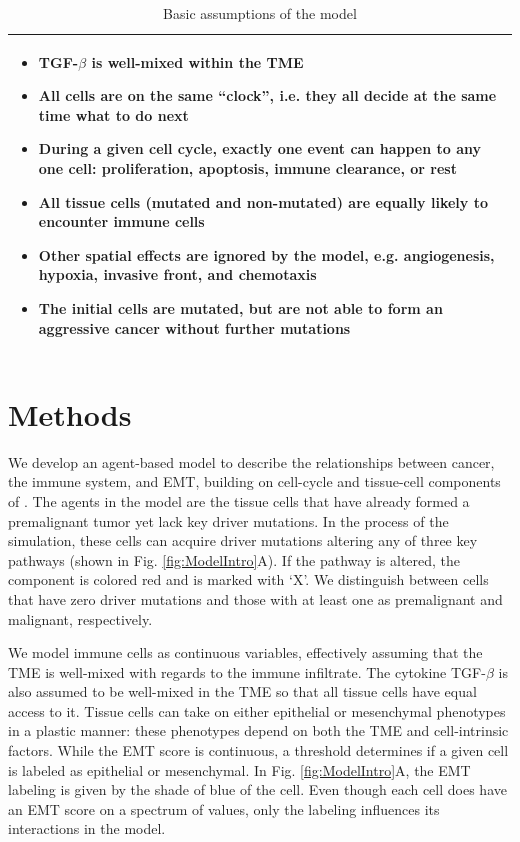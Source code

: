 \documentclass[11pt]{article}
\begin{document}
\begin{table}[H]
\begin{tabular}{|p{\textwidth}|}
\hline
\begin{itemize}
\item TGF-$\beta$ is well-mixed within the TME
\item All cells are on the same ``clock'', i.e. they all decide at the same time what to do next
\item During a given cell cycle, exactly one event can happen to any one cell: proliferation, apoptosis, immune clearance, or rest
\item All tissue cells (mutated and non-mutated) are equally likely to encounter immune cells
\item Other spatial effects are ignored by the model, e.g. angiogenesis, hypoxia, invasive front, and chemotaxis
\item The initial cells are mutated, but are not able to form an aggressive cancer without further mutations
\end{itemize}
\\
\hline
\end{tabular}
\caption{Basic assumptions of the model}
\label{table:model_assumptions}
\end{table}


\section{Methods}
We develop an agent-based model to describe the relationships between cancer, the immune system, and EMT, building on cell-cycle and tissue-cell components of \cite{guo17_multiscale}. 
The agents in the model are the tissue cells that have already formed a premalignant tumor yet lack key driver mutations.
In the process of the simulation, these cells can acquire driver mutations altering any of three key pathways (shown in Fig. \ref{fig:ModelIntro}A).
If the pathway is altered, the component is colored red and is marked with `X'.
We distinguish between cells that have zero driver mutations and those with at least one as premalignant and malignant, respectively.
\par
We model immune cells as continuous variables, effectively assuming that the TME is well-mixed with regards to the immune infiltrate.
The cytokine TGF-$\beta$ is also assumed to be well-mixed in the TME so that all tissue cells have equal access to it.
Tissue cells can take on either epithelial or mesenchymal phenotypes in a plastic manner: these phenotypes depend on both the TME and cell-intrinsic factors.
While the EMT score is continuous, a threshold determines if a given cell is labeled as epithelial or mesenchymal.
In Fig. \ref{fig:ModelIntro}A, the EMT labeling is given by the shade of blue of the cell.
Even though each cell does have an EMT score on a spectrum of values, only the labeling influences its interactions in the model.
\end{document}
